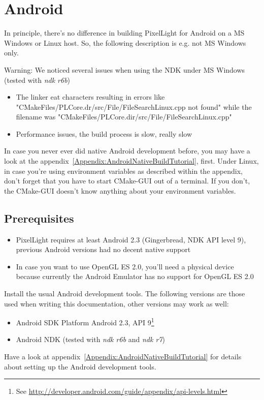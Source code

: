 \chapter{Android}
In principle, there's no difference in building PixelLight for Android on a \ac{MS} Windows or Linux host. So, the following description is e.g. not \ac{MS} Windows only.

Warning: We noticed several issues when using the \ac{NDK} under \ac{MS} Windows (tested with \emph{ndk r6b})
\begin{itemize}
\item{The linker eat characters resulting in errors like "CMakeFiles/PLCore.dr/src/File/FileSearchLinux.cpp not found" while the filename was "CMakeFiles/PLCore.dir/src/File/FileSearchLinux.cpp"}
\item{Performance issues, the build process is slow, really slow}
\end{itemize}

In case you never ever did native Android development before, you may have a look at the appendix~\ref{Appendix:AndroidNativeBuildTutorial}, first. Under Linux, in case you're using environment variables as described within the appendix, don't forget that you have to start CMake-GUI out of a terminal. If you don't, the CMake-GUI doesn't know anything about your environment variables.




\section{Prerequisites}
\begin{itemize}
\item{PixelLight requires at least Android 2.3 (Gingerbread, \ac{NDK} \ac{API} level 9), previous Android versions had no decent native support}
\item{In case you want to use OpenGL ES 2.0, you'll need a physical device because currently the Android Emulator has no support for OpenGL ES 2.0}
\end{itemize}

Install the usual Android development tools. The following versions are those used when writing this documentation, other versions may work as well:
\begin{itemize}
\item{Android \ac{SDK} Platform Android 2.3, \ac{API} 9\footnote{See \url{http://developer.android.com/guide/appendix/api-levels.html}}}
\item{Android \ac{NDK} (tested with \emph{ndk r6b} and \emph{ndk r7})}
\end{itemize}
Have a look at appendix~\ref{Appendix:AndroidNativeBuildTutorial} for details about setting up the Android development tools.


